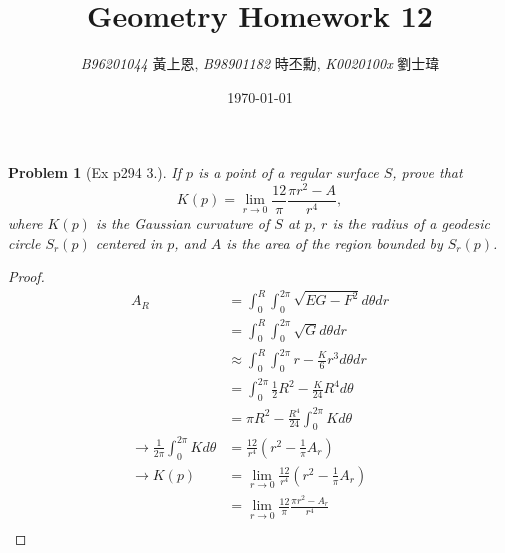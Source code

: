 \documentclass[10pt,a4paper]{article}
\newcommand{\LiHei}{\CJKfamily{lh}}
\newcounter{theProblemCounter}
\newtheorem{problem}[theProblemCounter]{Problem}
\begin{document}
\title{{Geometry Homework 12}}
\author{{\it{B96201044}} {\LiHei 黃上恩}, {\it{B98901182}} {\LiHei 時丕勳}, {\it{K0020100x}} {\LiHei 劉士瑋}}
\date{\today}
\maketitle

\newcommand{\bx}{\mathbb{X}}
\newcommand{\bfx}{\mathbf{x}}
\newcommand{\grad}{\textrm{grad }}
\newcommand{\sech}{\mbox{sech}}

\setcounter{theProblemCounter}{2}
\begin{problem}[Ex p294 3.]
If $p$ is a point of a regular surface $S$, prove that \[ K(p) = \lim_{r\to 0}\frac{12}{\pi}\frac{\pi r^2-A}{r^4}, \] where $K(p)$ is the Gaussian curvature of $S$ at $p$, $r$ is the radius of a geodesic circle $S_r(p)$ centered in $p$, and $A$ is the area of the region bounded by $S_r(p)$.
\end{problem}
\begin{proof}
\begin{align*}
A_R&=\int_{0}^{R}\int_0^{2\pi}\sqrt{EG-F^2}d\theta dr\\
&=\int_{0}^{R}\int_0^{2\pi}\sqrt{G}d\theta dr\\
&\approx \int_{0}^{R}\int_0^{2\pi} r-\frac{K}{6}r^3 d\theta dr\\
&=\int_0^{2\pi}\frac{1}{2}R^2-\frac{K}{24}R^4 d\theta\\
&=\pi R^2-\frac{R^4}{24}\int_0^{2\pi}K d\theta\\
\rightarrow \frac{1}{2\pi}\int_0^{2\pi}K d\theta &=\frac{12}{r^4}(r^2-\frac{1}{\pi}A_r)\\
\rightarrow K(p)&=\lim_{r\to 0}\frac{12}{r^4}(r^2-\frac{1}{\pi}A_r)\\
&=\lim_{r\to 0}\frac{12}{\pi}\frac{\pi r^2-A_r}{r^4}\\
\end{align*}
\end{proof}
\end{document}
